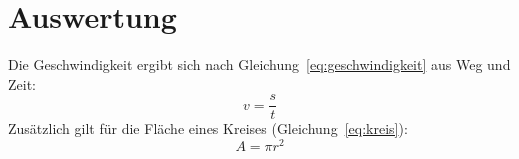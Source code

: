 \documentclass[a4paper,12pt]{article}
\begin{document}
\section{Auswertung}
Die Geschwindigkeit ergibt sich nach Gleichung~\ref{eq:geschwindigkeit}
aus Weg und Zeit:
\begin{equation}
  v = \frac{s}{t}
  \label{eq:geschwindigkeit}
\end{equation}
Zusätzlich gilt für die Fläche eines Kreises (Gleichung~\ref{eq:kreis}):
\begin{equation}
  A = \pi r^{2}
  \label{eq:kreis}
\end{equation}

\printbibliography
\end{document}

